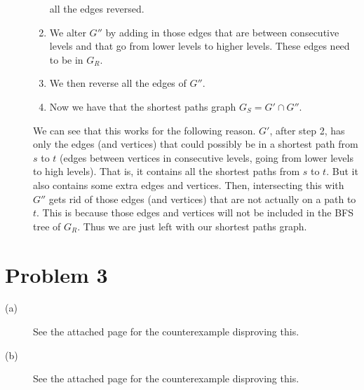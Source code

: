 \documentclass{article}
\begin{document}
\begin{description}
\begin{enumerate}
                all the edges reversed.
            \item We alter $G''$ by adding in those edges that are between
                consecutive levels and that go from lower levels to higher
                levels. These edges need to be in $G_R$.
            \item We then reverse all the edges of $G''$.
            \item Now we have that the shortest paths graph $G_S = G' \cap G''$.
        \end{enumerate}
        We can see that this works for the following reason. $G'$, after
        step 2, has only the edges (and vertices) that could possibly be in a
        shortest path from $s$ to $t$ (edges between vertices in consecutive
        levels, going from lower levels to high levels). That is, it contains
        all the shortest paths from $s$ to $t$. But it also contains some extra
        edges and vertices. Then, intersecting
        this with $G''$ gets rid of those edges (and vertices) that are not
        actually on a path to $t$. This is because those edges and vertices
        will not be included in the BFS tree of $G_R$.
        Thus we are just left with our shortest paths graph.
\end{description}

\section*{Problem 3}
\begin{description}
    \item[(a)] See the attached page for the counterexample disproving this.
    \item[(b)] See the attached page for the counterexample disproving this.
\end{description}

\end{document}
